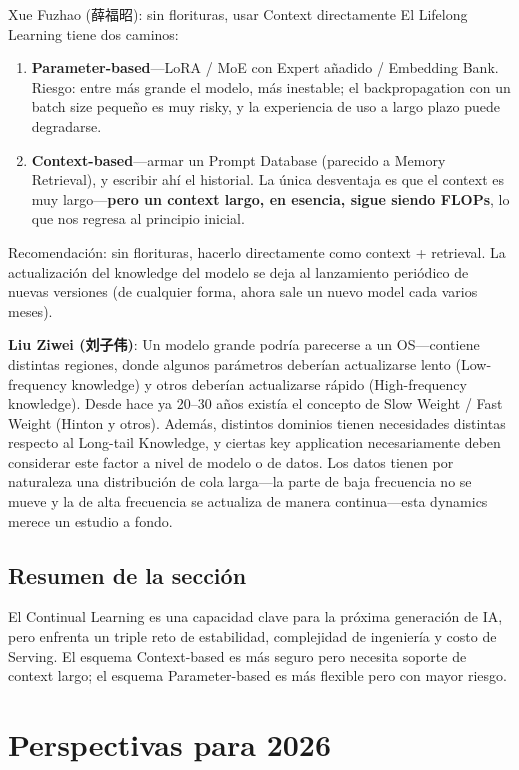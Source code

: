 \documentclass[a4paper]{article}
\begin{document}
\begin{knowledgebox}{Xue Fuzhao (薛福昭): sin florituras, usar Context directamente}
El Lifelong Learning tiene dos caminos:
\begin{enumerate}
  \item \textbf{Parameter-based}—LoRA / MoE con Expert añadido / Embedding Bank. Riesgo: entre más grande el modelo, más inestable; el backpropagation con un batch size pequeño es muy risky, y la experiencia de uso a largo plazo puede degradarse.
  \item \textbf{Context-based}—armar un Prompt Database (parecido a Memory Retrieval), y escribir ahí el historial. La única desventaja es que el context es muy largo—\textbf{pero un context largo, en esencia, sigue siendo FLOPs}, lo que nos regresa al principio inicial.
\end{enumerate}
Recomendación: sin florituras, hacerlo directamente como context + retrieval. La actualización del knowledge del modelo se deja al lanzamiento periódico de nuevas versiones (de cualquier forma, ahora sale un nuevo model cada varios meses).
\end{knowledgebox}

\textbf{Liu Ziwei (刘子伟)}: Un modelo grande podría parecerse a un OS—contiene distintas regiones, donde algunos parámetros deberían actualizarse lento (Low-frequency knowledge) y otros deberían actualizarse rápido (High-frequency knowledge). Desde hace ya 20--30 años existía el concepto de Slow Weight / Fast Weight (Hinton y otros). Además, distintos dominios tienen necesidades distintas respecto al Long-tail Knowledge, y ciertas key application necesariamente deben considerar este factor a nivel de modelo o de datos. Los datos tienen por naturaleza una distribución de cola larga—la parte de baja frecuencia no se mueve y la de alta frecuencia se actualiza de manera continua—esta dynamics merece un estudio a fondo.

\subsection{Resumen de la sección}
El Continual Learning es una capacidad clave para la próxima generación de IA, pero enfrenta un triple reto de estabilidad, complejidad de ingeniería y costo de Serving. El esquema Context-based es más seguro pero necesita soporte de context largo; el esquema Parameter-based es más flexible pero con mayor riesgo.

\section{Perspectivas para 2026}
\end{document}
